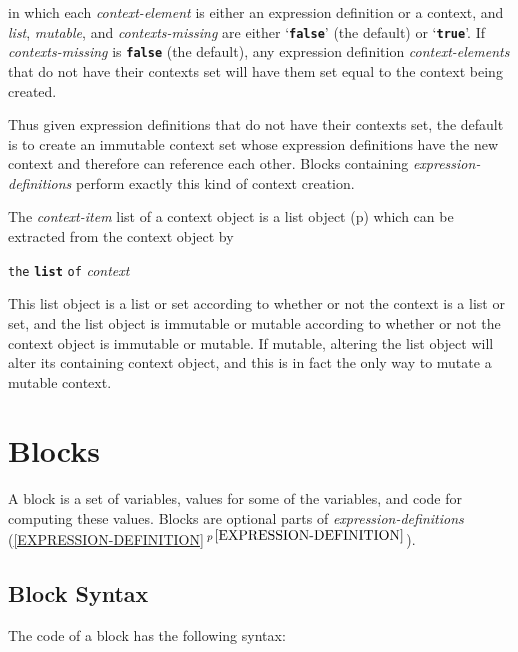 \documentclass[12pt]{article}
\makeatletter
\newcommand{\TT}[1]{{\tt \bfseries #1}}
\newcommand{\ttmkey}[2]{\TT{#1}\index{#1@{\tt #1}!#2}}
\newcommand{\secref}[1]{\ref{#1}$\,^{p\,\pageref{#1}}$}
\newcommand{\pagref}[1]{p\pageref{#1}}
\newenvironment{indpar}[1][0.3in]%
	{\begin{list}{}%
		     {\setlength{\itemsep}{0in}%
		      \setlength{\topsep}{0in}%
		      \setlength{\parsep}{1ex}%
		      \setlength{\labelwidth}{#1}%
		      \setlength{\leftmargin}{#1}%
		      \addtolength{\leftmargin}{\labelsep}}%
	 \item}%
	{\end{list}}
\makeatother
\begin{document}
in which each {\em context-element} is either an expression definition or
a context, and {\em list}, {\em mutable}, and {\em contexts-missing}
are either `\TT{false}' (the default) or `\TT{true}'.
If {\em contexts-missing} is \TT{false} (the default), any expression
definition {\em context-elements} that do not have their
contexts set will have them set equal to the context being created.

Thus given expression definitions that do not have their contexts set,
the default is to create an immutable context set whose expression definitions
have the new context and therefore can reference each other.  Blocks
containing {\em expression-definitions} perform exactly this kind of
context creation.

The {\em context-item} list of a context object is a list object
(\pagref{LIST}) which can be extracted from the context object by

\begin{indpar}
\verb|the| \ttmkey{list}{of context} \verb|of| {\em context}
\end{indpar}

This list object is a list or set according to whether or not the
context is a list or set, and the list object is immutable or mutable
according to whether or not the context object is immutable or mutable.
If mutable, altering the list object will alter its containing context
object, and this is in fact the only way to mutate a mutable context.

\section{Blocks}
\label{BLOCKS}

A block is a set of variables, values for some of the variables, and
code for computing these values.  Blocks are optional parts of
{\em expression-definitions} (\secref{EXPRESSION-DEFINITION}).

\subsection{Block Syntax}
\label{BLOCK-SYNTAX}

The code of a block has the following syntax:
\end{document}
